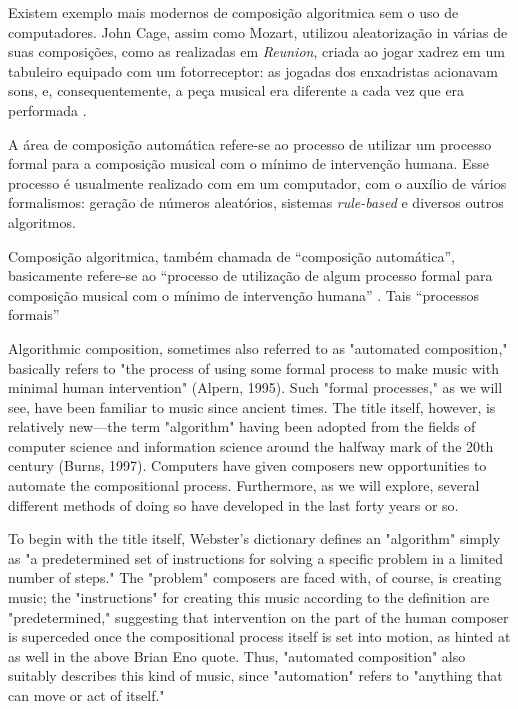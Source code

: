 \documentclass{automatextcc}
\begin{document}
Existem exemplo mais modernos de composição algoritmica sem o uso de computadores. John Cage, assim como Mozart, utilizou aleatorização in várias de suas composições, como as realizadas em \textit{Reunion}, criada ao jogar xadrez em um tabuleiro equipado com um fotorreceptor: as jogadas dos enxadristas acionavam sons, e, consequentemente, a peça musical era diferente a cada vez que era performada \citep{alpern1995}.


A área de composição automática refere-se ao processo de utilizar um processo formal para a composição musical com o mínimo de intervenção humana. Esse processo é usualmente realizado com em um computador, com o auxílio de vários formalismos: geração de números aleatórios, sistemas \textit{rule-based} e diversos outros algoritmos.


Composição algoritmica, também chamada de ``composição automática'', basicamente refere-se ao ``processo de utilização de algum processo formal para composição musical com o mínimo de intervenção humana'' \citep{alpern1995}. Tais ``processos formais''

Algorithmic composition, sometimes also referred to as "automated composition," basically refers to "the process of using some formal process to make music with minimal human intervention" (Alpern, 1995). Such "formal processes," as we will see, have been familiar to music since ancient times. The title itself, however, is relatively new—the term "algorithm" having been adopted from the fields of computer science and information science around the halfway mark of the 20th century (Burns, 1997). Computers have given composers new opportunities to automate the compositional process. Furthermore, as we will explore, several different methods of doing so have developed in the last forty years or so.

To begin with the title itself, Webster's dictionary defines an "algorithm" simply as "a predetermined set of instructions for solving a specific problem in a limited number of steps." The "problem" composers are faced with, of course, is creating music; the "instructions" for creating this music according to the definition are "predetermined," suggesting that intervention on the part of the human composer is superceded once the compositional process itself is set into motion, as hinted at as well in the above Brian Eno quote. Thus, "automated composition" also suitably describes this kind of music, since "automation" refers to "anything that can move or act of itself."
\end{document}
